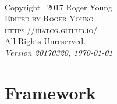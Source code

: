 \documentclass[11pt,fleqn]{book}
\makeatletter
\renewcommand{\cleardoublepage}{
	\clearpage\ifodd\c@page\else
	\hbox{}
	\vspace*{\fill}
	\thispagestyle{empty}
	\newpage
	\fi}
\numberwithin{dummy}{section}
\theoremstyle{ocrenumbox}
\theoremstyle{blacknumex}
\theoremstyle{blacknumbox}
\theoremstyle{ocrenum}
\newif\ifusechapterimage
\newcommand{\thechapterimage}{}%
\newcommand{\chapterimage}[1]{\ifusechapterimage\renewcommand{\thechapterimage}{#1}\fi}%
\makeatother
\begin{document}

\newpage
~\vfill
\thispagestyle{empty}

\noindent Copyright \textcopyright\ 2017 Roger Young\\ %

\noindent \textsc{Edited by Roger Young}\\ %

\noindent \textsc{\url{https://hiatcg.github.io/}}\\ %

\noindent All Rights Unreserved.\\ %

\noindent \textit{Version 20170320, \today} %



\chapterimage{chapterhead1.pdf} %

\pagestyle{empty} %

\tableofcontents %

\cleardoublepage %

\pagestyle{fancy} %


\part{Framework}


\chapterimage{chapterhead2.pdf} %
\end{document}
